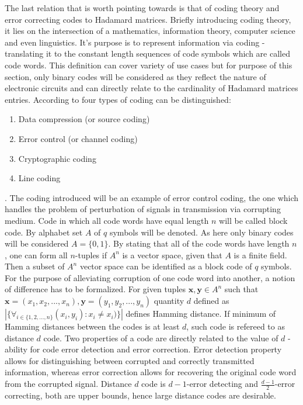 \par The last relation that is worth pointing towards is that of coding theory and error correcting codes to Hadamard matrices. Briefly introducing coding theory, it lies on the intersection of a mathematics, information theory, computer science and even linguistics. It's purpose is to represent information via coding - translating it to the constant length sequences of code symbols which are called code words. This definition can cover variety of use cases but for purpose of this section, only binary codes will be considered as they reflect the nature of electronic circuits and can directly relate to the cardinality of Hadamard matrices entries. According to \cite{coding_types_irvine} four types of coding can be distinguished:
\begin{enumerate}
    \item Data compression (or source coding) 
    \item Error control (or channel coding)
    \item Cryptographic coding 
    \item Line coding
\end{enumerate}. The coding introduced will be an example of error control coding, the one which handles the problem of perturbation of signals in transmission via corrupting medium. 
Code in which all code words have equal length $n$ will be called block code. By alphabet set $A$ of $q$ symbols will be denoted. As here only binary codes will be considered $A = \{0, 1\}$. By stating that all of the code words have length $n$, one can form all $n$-tuples if $A^n$ is a vector space, given that $A$ is a finite field. Then a subset of $A^n$ vector space can be identified as a block code of $q$ symbols.
For the purpose of alleviating corruption of one code word into another, a notion of difference has to be formalized. For given tuples $\mathbf{x}, \mathbf{y} \in {A^n}$ such that $\mathbf{x} = (x_1, x_2, ..., x_n), \mathbf{y} = (y_1, y_2, ..., y_n)$ quantity $d$ defined as $|\{\forall_{i \in \{1,2, ..., n\}} (x_i,  y_i) : x_i \neq x_i)\}|$ defines Hamming distance. If minimum of Hamming distances between the codes is at least $d$, such code is refereed to as distance $d$ code. Two properties of a code are directly related to the value of $d$ - ability for code error detection and error correction. Error detection property allows for distinguishing between corrupted and correctly transmitted information, whereas error correction allows for recovering the original code word from the corrupted signal. Distance $d$ code  is $d-1$-error detecting and $\frac{d-1}{2}$-error correcting, both are upper bounds, hence large distance codes are desirable.
